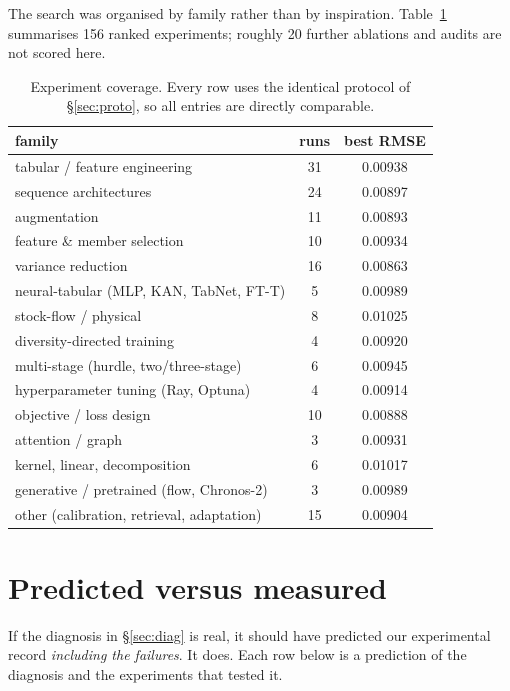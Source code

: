 \documentclass[10pt,letterpaper,twocolumn]{article}
\begin{document}
The search was organised by family rather than by inspiration. Table~\ref{tab:cov}
summarises 156 ranked experiments; roughly 20 further ablations and audits are
not scored here.

\begin{table}[ht]\small\centering
\begin{tabular}{lcc}
\toprule
family & runs & best RMSE \\
\midrule
tabular / feature engineering & 31 & 0.00938 \\
sequence architectures & 24 & 0.00897 \\
augmentation & 11 & 0.00893 \\
feature \& member selection & 10 & 0.00934 \\
variance reduction & 16 & 0.00863 \\
neural-tabular (MLP, KAN, TabNet, FT-T) & 5 & 0.00989 \\
stock-flow / physical & 8 & 0.01025 \\
diversity-directed training & 4 & 0.00920 \\
multi-stage (hurdle, two/three-stage) & 6 & 0.00945 \\
hyperparameter tuning (Ray, Optuna) & 4 & 0.00914 \\
objective / loss design & 10 & 0.00888 \\
attention / graph & 3 & 0.00931 \\
kernel, linear, decomposition & 6 & 0.01017 \\
generative / pretrained (flow, Chronos-2) & 3 & 0.00989 \\
other (calibration, retrieval, adaptation) & 15 & 0.00904 \\
\bottomrule
\end{tabular}
\caption{Experiment coverage. Every row uses the identical protocol of
§\ref{sec:proto}, so all entries are directly comparable.}
\label{tab:cov}
\end{table}

\section{Predicted versus measured}
\label{sec:ledger}

If the diagnosis in §\ref{sec:diag} is real, it should have predicted our
experimental record \emph{including the failures}. It does. Each row below is a
prediction of the diagnosis and the experiments that tested it.
\end{document}
